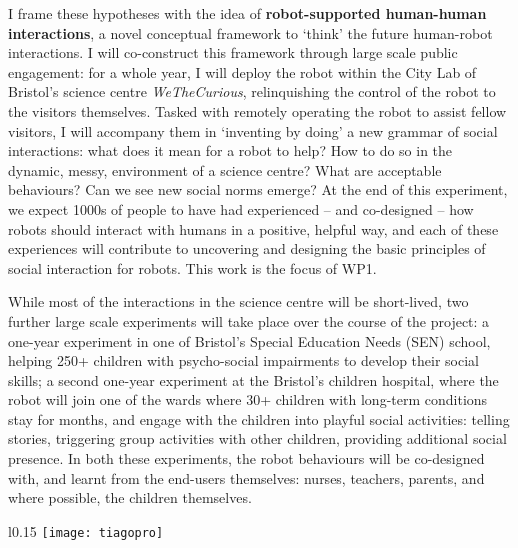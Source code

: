 

I frame these hypotheses with the idea of \textbf{robot-supported human-human
interactions}, a novel conceptual framework to `think' the future human-robot
interactions. I will co-construct this framework through large scale public
engagement: for a whole year, I will deploy the \project robot within the City
Lab of Bristol's science centre \emph{WeTheCurious}, relinquishing the control
of the robot to the visitors themselves. Tasked with remotely operating the
robot to assist fellow visitors, I will accompany them in `inventing by doing' a
new grammar of social interactions: what does it mean for a robot to help? How
to do so in the dynamic, messy, environment of a science centre? What are acceptable
behaviours? Can we see new social norms emerge? At the end of this experiment,
we expect 1000s of people to have had experienced -- and co-designed -- how
robots should interact with humans in a positive, helpful way, and each of these
experiences will contribute to uncovering and designing the basic principles of
social interaction for robots. This work is the focus of WP1.

While most of the interactions in the science centre will be short-lived, two further
large scale experiments will take place over the course of the project: a
one-year experiment in one of Bristol's Special Education Needs (SEN) school,
helping 250+ children with psycho-social impairments to develop their social
skills; a second one-year experiment at the Bristol's children hospital, where
the robot will join one of the wards where 30+ children with long-term conditions
stay for months, and engage with the children into playful social activities: telling
stories, triggering group activities with other children, providing additional
social presence. In both these experiments, the robot behaviours will be
co-designed with, and learnt from the end-users themselves: nurses, teachers,
parents, and where possible, the children themselves.


\begin{wrapfigure}[11]{l}{0.15\linewidth}
    \centering
    \vspace{-10pt}
    \texttt{[image: tiagopro]}
    \label{fig|tiagopro}
\end{wrapfigure}

